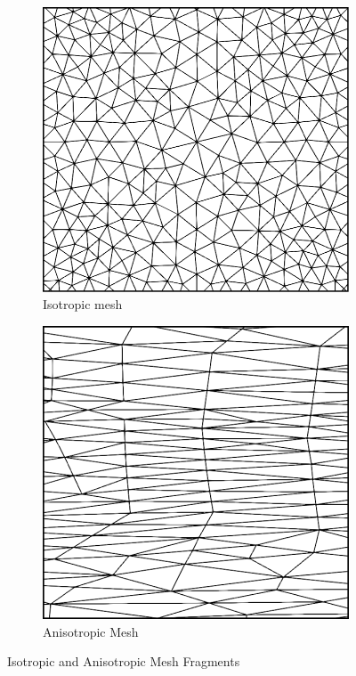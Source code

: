 \begin{figure}
	\centering
	\begin{subfigure}{0.5\linewidth}
	  \centering
	  \includegraphics[width=0.9\linewidth]{img/intro/isotropic.png}
	  \caption{Isotropic mesh}
	  \label{fig-isotropic}
	\end{subfigure}%
	\begin{subfigure}{0.5\linewidth}
		\centering
		\includegraphics[width=0.88\linewidth]{img/intro/anisotropic.png}
		\caption{Anisotropic Mesh}
		\label{fig-anisotropic}
	\end{subfigure}
	\caption{Isotropic and Anisotropic Mesh Fragments}
	\label{fig-isotropic-anisotropic}
\end{figure}

